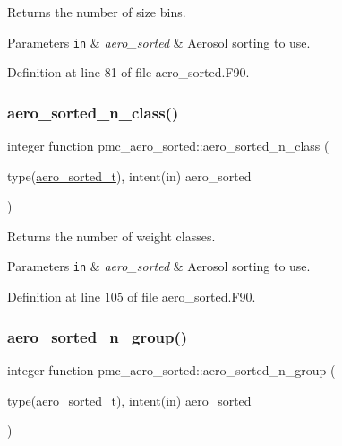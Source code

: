 Returns the number of size bins. 


\begin{DoxyParams}[1]{Parameters}
\mbox{\tt in}  & {\em aero\+\_\+sorted} & Aerosol sorting to use. \\
\hline
\end{DoxyParams}


Definition at line 81 of file aero\+\_\+sorted.\+F90.

\mbox{\label{namespacepmc__aero__sorted_ae636353a0655df03ed70f4aa894cd11a}} 
\subsubsection{\texorpdfstring{aero\+\_\+sorted\+\_\+n\+\_\+class()}{aero\_sorted\_n\_class()}}
{\footnotesize\ttfamily integer function pmc\+\_\+aero\+\_\+sorted\+::aero\+\_\+sorted\+\_\+n\+\_\+class (\begin{DoxyParamCaption}\item[{type(\mbox{\hyperlink{structpmc__aero__sorted_1_1aero__sorted__t}{aero\+\_\+sorted\+\_\+t}}), intent(in)}]{aero\+\_\+sorted }\end{DoxyParamCaption})}



Returns the number of weight classes. 


\begin{DoxyParams}[1]{Parameters}
\mbox{\tt in}  & {\em aero\+\_\+sorted} & Aerosol sorting to use. \\
\hline
\end{DoxyParams}


Definition at line 105 of file aero\+\_\+sorted.\+F90.

\mbox{\label{namespacepmc__aero__sorted_ac4d78c0767389592acbc13d935d8561a}} 
\subsubsection{\texorpdfstring{aero\+\_\+sorted\+\_\+n\+\_\+group()}{aero\_sorted\_n\_group()}}
{\footnotesize\ttfamily integer function pmc\+\_\+aero\+\_\+sorted\+::aero\+\_\+sorted\+\_\+n\+\_\+group (\begin{DoxyParamCaption}\item[{type(\mbox{\hyperlink{structpmc__aero__sorted_1_1aero__sorted__t}{aero\+\_\+sorted\+\_\+t}}), intent(in)}]{aero\+\_\+sorted }\end{DoxyParamCaption})}



